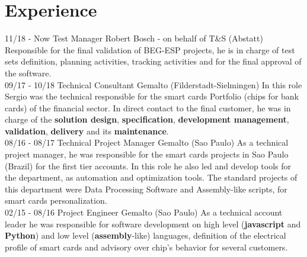 \documentclass[]{friggeri-cv}
\begin{document}

\section{Experience}
\begin{entrylist}
  \entry
    {11/18 - Now}
    {Test Manager}
    {\normalsize{Robert Bosch - on behalf of T\&S (Abstatt)}}
    {Responsible for the final validation of BEG-ESP projects, he is in charge of test sets definition, planning activities, tracking activities and for the final approval of the software.
    \\}
  \entry
    {09/17 - 10/18}
    {Technical Consultant}
    {\normalsize{Gemalto (Filderstadt-Sielmingen)}}
    {In this role Sergio was the technical responsible for the smart cards Portfolio (chips for bank cards) of the  financial sector. In direct contact to the final customer, he was in charge of the \textbf{solution design},\textbf{ specification},\textbf{ development management},\textbf{ validation},\textbf{ delivery} and its\textbf{ maintenance}.
     \\}
  \entry
    {08/16 - 08/17}
    {Technical Project Manager}
    {\normalsize{Gemalto (Sao Paulo)}}
    {As a technical project manager, he was responsible for the smart cards projects in Sao Paulo (Brazil) for the first tier accounts. In this role he also led and develop tools for the department, as automation and optimization tools. The standard projects of this department were Data Processing Software and Assembly-like scripts, for smart cards personalization. 
    \\}
    \entry
    {02/15 - 08/16}
    {Project Engineer}
    {\normalsize{Gemalto (Sao Paulo)}}
    {As a technical account leader he was responsible for software development on high level (\textbf{javascript} and \textbf{Python}) and low level (\textbf{assembly}-like) languages, definition of the electrical profile of smart cards and advisory over chip's behavior for several customers. \\}
    

\end{entrylist}
\end{document}

